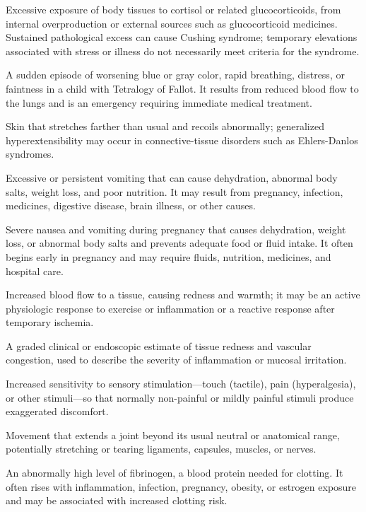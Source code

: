  Excessive exposure of body tissues to cortisol or related glucocorticoids, from internal overproduction or external sources such as glucocorticoid medicines. Sustained pathological excess can cause Cushing syndrome; temporary elevations associated with stress or illness do not necessarily meet criteria for the syndrome.

 A sudden episode of worsening blue or gray color, rapid breathing, distress, or faintness in a child with Tetralogy of Fallot. It results from reduced blood flow to the lungs and is an emergency requiring immediate medical treatment.

 Skin that stretches farther than usual and recoils abnormally; generalized hyperextensibility may occur in connective-tissue disorders such as Ehlers-Danlos syndromes.

 Excessive or persistent vomiting that can cause dehydration, abnormal body salts, weight loss, and poor nutrition. It may result from pregnancy, infection, medicines, digestive disease, brain illness, or other causes.

 Severe nausea and vomiting during pregnancy that causes dehydration, weight loss, or abnormal body salts and prevents adequate food or fluid intake. It often begins early in pregnancy and may require fluids, nutrition, medicines, and hospital care.

 Increased blood flow to a tissue, causing redness and warmth; it may be an active physiologic response to exercise or inflammation or a reactive response after temporary ischemia.

 A graded clinical or endoscopic estimate of tissue redness and vascular congestion, used to describe the severity of inflammation or mucosal irritation.

 Increased sensitivity to sensory stimulation—touch (tactile), pain (hyperalgesia), or
other stimuli—so that normally non-painful or mildly painful stimuli produce exaggerated
discomfort.

 Movement that extends a joint beyond its usual neutral or anatomical range, potentially stretching or tearing ligaments, capsules, muscles, or nerves.

 An abnormally high level of fibrinogen, a blood protein needed for clotting. It often rises with inflammation, infection, pregnancy, obesity, or estrogen exposure and may be associated with increased clotting risk.

